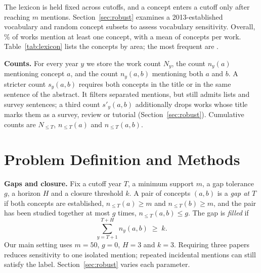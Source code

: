 \documentclass[runningheads]{llncs}
\newcommand{\bench}{GapCast-6G}
\begin{document}
The lexicon is held fixed across cutoffs, and a concept enters a cutoff only after reaching $m$ mentions. Section~\ref{sec:robust} examines a 2013-established vocabulary and random concept subsets to assess vocabulary sensitivity. Overall, \taggedShare{}\% of works mention at least one concept, with a mean of \meanConcepts{} concepts per work. Table~\ref{tab:lexicon} lists the concepts by area; the most frequent are \topConcepts{}.

\begin{table}[t]
\centering
\caption{The \nConcepts{} concepts of \bench{}, grouped by INISCOM 2027 area (counts in brackets). Pattern definitions are provided in the accompanying lexicon source.}
\label{tab:lexicon}
\scriptsize

\end{table}

\textbf{Counts.} For every year $y$ we store the work count $N_y$, the count $n_y(a)$ mentioning concept $a$, and the count $n_y(a,b)$ mentioning both $a$ and $b$. A stricter count $s_y(a,b)$ requires both concepts in the title or in the same sentence of the abstract. It filters separated mentions, but still admits lists and survey sentences; a third count $s'_y(a,b)$ additionally drops works whose title marks them as a survey, review or tutorial (Section~\ref{sec:robust}). Cumulative counts are $N_{\le T}$, $n_{\le T}(a)$ and $n_{\le T}(a,b)$.

\section{Problem Definition and Methods}

\textbf{Gaps and closure.} Fix a cutoff year $T$, a minimum support $m$, a gap tolerance $g$, a horizon $H$ and a closure threshold $k$. A pair of concepts $(a,b)$ is a \emph{gap at $T$} if both concepts are established, $n_{\le T}(a)\ge m$ and $n_{\le T}(b)\ge m$, and the pair has been studied together at most $g$ times, $n_{\le T}(a,b)\le g$. The gap is \emph{filled} if
\begin{equation}
\sum_{y=T+1}^{T+H} n_y(a,b) \;\ge\; k .
\end{equation}
Our main setting uses $m=50$, $g=0$, $H=3$ and $k=3$. Requiring three papers reduces sensitivity to one isolated mention; repeated incidental mentions can still satisfy the label. Section~\ref{sec:robust} varies each parameter.
\end{document}
